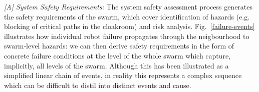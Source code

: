 \documentclass[runningheads]{llncs}
\begin{document}

\emph{[A] System Safety Requirements:}
The system safety assessment process generates the safety requirements of the swarm, which cover identification of hazards (e.g. blocking of critical paths in the cloakroom) and risk analysis.
Fig.~\ref{failure-events} illustrates how individual robot failure propagates through the neigbourhood to swarm-level hazards: we can then derive safety requirements in the form of concrete failure conditions at the level of the whole swarm which capture, implicitly, all levels of the swarm.
Although this has been illustrated as a simplified linear chain of events, in reality this represents a complex sequence which can be difficult to distil into distinct events and cause. 
\end{document}
